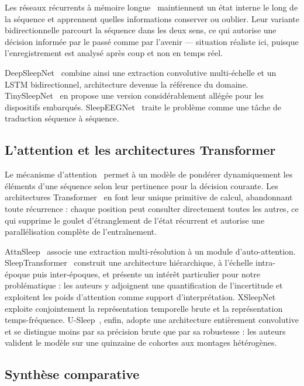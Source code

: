 Les réseaux récurrents à mémoire longue~\cite{hochreiter1997} maintiennent un état
interne le long de la séquence et apprennent quelles informations conserver ou
oublier. Leur variante bidirectionnelle parcourt la séquence dans les deux sens, ce
qui autorise une décision informée par le passé comme par l'avenir — situation
réaliste ici, puisque l'enregistrement est analysé après coup et non en temps réel.

DeepSleepNet~\cite{supratak2017} combine ainsi une extraction convolutive
multi-échelle et un LSTM bidirectionnel, architecture devenue la référence du domaine.
TinySleepNet~\cite{supratak2020} en propose une version considérablement allégée pour
les dispositifs embarqués. SleepEEGNet~\cite{mousavi2019} traite le problème comme une
tâche de traduction séquence à séquence.

\subsection{L'attention et les architectures Transformer}

Le mécanisme d'attention~\cite{bahdanau2015} permet à un modèle de pondérer
dynamiquement les éléments d'une séquence selon leur pertinence pour la décision
courante. Les architectures Transformer~\cite{vaswani2017} en font leur unique
primitive de calcul, abandonnant toute récurrence : chaque position peut consulter
directement toutes les autres, ce qui supprime le goulet d'étranglement de l'état
récurrent et autorise une parallélisation complète de l'entraînement.

AttnSleep~\cite{eldele2021} associe une extraction multi-résolution à un module
d'auto-attention. SleepTransformer~\cite{phan2022} construit une architecture
hiérarchique, à l'échelle intra-époque puis inter-époques, et présente un intérêt
particulier pour notre problématique : les auteurs y adjoignent une quantification de
l'incertitude et exploitent les poids d'attention comme support d'interprétation.
XSleepNet~\cite{phan2021} exploite conjointement la représentation temporelle brute et
la représentation temps-fréquence. U-Sleep~\cite{perslev2021}, enfin, adopte une
architecture entièrement convolutive et se distingue moins par sa précision brute que
par sa robustesse : les auteurs valident le modèle sur une quinzaine de cohortes aux
montages hétérogènes.

\subsection{Synthèse comparative}

